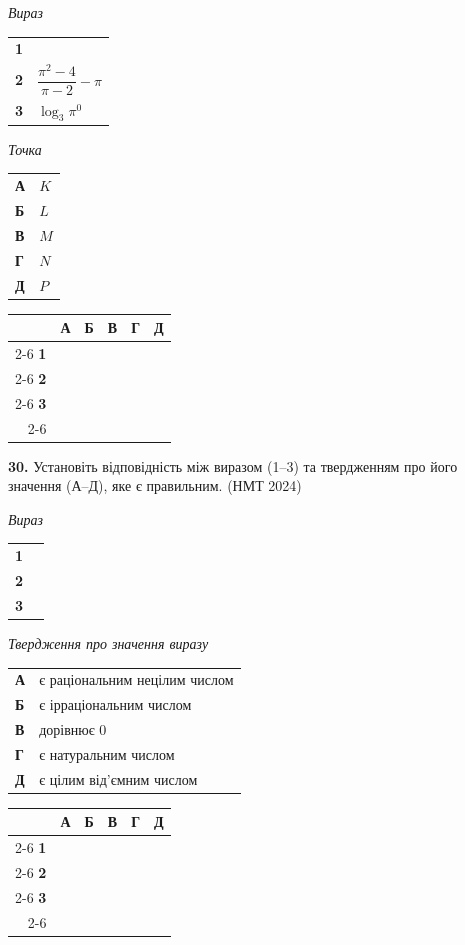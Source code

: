\documentclass[14pt]{extarticle}
\newcommand{\answerGrid}{
    \begingroup
    \renewcommand{\arraystretch}{1.3} 
    \setlength{\tabcolsep}{7pt} 
    \begin{tabular}{r|c|c|c|c|c|}
         \multicolumn{1}{c}{} & \multicolumn{1}{c}{\textbf{А}} & \multicolumn{1}{c}{\textbf{Б}} & \multicolumn{1}{c}{\textbf{В}} & \multicolumn{1}{c}{\textbf{Г}} & \multicolumn{1}{c}{\textbf{Д}} \\ \cline{2-6}
         \textbf{1} & & & & & \\ \cline{2-6}
         \textbf{2} & & & & & \\ \cline{2-6}
         \textbf{3} & & & & & \\ \cline{2-6}
    \end{tabular}
    \endgroup
}
\newcommand{\matchingLayout}[3]{
    \noindent
    \begin{minipage}[t]{0.40\textwidth}
       
        #1
    \end{minipage}%
    \hfill
    \begin{minipage}[t]{0.28\textwidth}
        
        #2
    \end{minipage}%
    \hfill
    \begin{minipage}[t]{0.30\textwidth}
        \vspace{0pt} %
        \begin{flushright}
        #3
        \end{flushright}
    \end{minipage}
}
\newcommand{\nmtyear}[1]{\hfill{\small\color{yearcolor}(НМТ #1)}}
\begin{document}
\matchingLayout{
    \textit{Вираз} \par \vspace{0.2cm}
    \begin{tabular}{@{}p{0.5cm} l@{}}
    \textbf{1} & \trigStyle{$\sin^2 \dfrac{\pi}{6} + \cos^2 \dfrac{\pi}{6}$} \\[0.4cm]
    \textbf{2} & $\dfrac{\pi^2-4}{\pi-2} - \pi$ \\[0.6cm]
    \textbf{3} & $\log_3 \pi^0$ \\
    \end{tabular}
}{
    \textit{Точка} \par \vspace{0.2cm}
    \begin{tabular}{@{}p{0.5cm} l@{}}
    \textbf{А} & $K$ \\[0.2cm]
    \textbf{Б} & $L$ \\[0.2cm]
    \textbf{В} & $M$ \\[0.2cm]
    \textbf{Г} & $N$ \\[0.2cm]
    \textbf{Д} & $P$ \\
    \end{tabular}
}{
    \answerGrid
}

\vspace{0.7cm}

\noindent\textbf{30.} Установіть відповідність між виразом (1--3) та твердженням про його значення (А--Д), яке є правильним. \nmtyear{2024}

\vspace{0.3cm}

\matchingLayout{
    \textit{Вираз} \par \vspace{0.2cm}
    \begin{tabular}{@{}p{0.5cm} l@{}}
    \textbf{1} & \trigStyle{$\sin \dfrac{7\pi}{2}$} \\[0.4cm]
    \textbf{2} & \trigStyle{$\pi^{\cos 90^\circ}$} \\[0.4cm]
    \textbf{3} & \trigStyle{$\dfrac{\pi}{3}$} \\
    \end{tabular}
}{
    \textit{Твердження про значення виразу} \par \vspace{0.2cm}
    \begin{tabular}{@{}p{0.3cm} p{5cm}@{}}
    \textbf{А} & є раціональним нецілим числом \\[0.2cm]
    \textbf{Б} & є ірраціональним числом \\[0.2cm]
    \textbf{В} & дорівнює 0 \\[0.2cm]
    \textbf{Г} & є натуральним числом \\[0.2cm]
    \textbf{Д} & є цілим від'ємним числом \\
    \end{tabular}
}{
    \answerGrid
}
\end{document}
